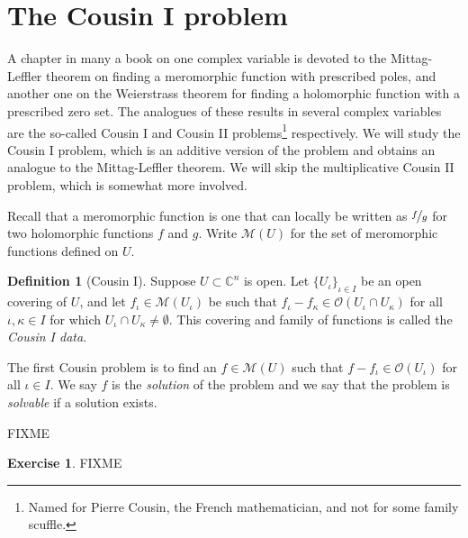 \documentclass[12pt,openany]{book}
\newcommand{\C}{{\mathbb{C}}}
\newcommand{\sM}{{\mathscr{M}}}
\newcommand{\sO}{{\mathscr{O}}}
\newcommand{\myindex}[1]{#1\index{#1}}
\theoremstyle{plain}
\theoremstyle{remark}
\theoremstyle{definition}
\newtheorem{defn}[thm]{Definition}
\newenvironment{exbox}{%
    \def\FrameCommand{\vrule width 1pt \relax\hspace{10pt}}%
    \MakeFramed{\advance\hsize-\width\FrameRestore}%
}{%
    \endMakeFramed
}
\theoremstyle{exercise}
\newtheorem{exercise}{Exercise}[section]
\theoremstyle{example}
\begin{document}

\section{The Cousin I problem} \label{sec:cousinI}

A chapter in many a book on one complex variable is devoted to the
Mittag-Leffler theorem on finding a meromorphic function with prescribed
poles, and another one on the Weierstrass theorem for finding a holomorphic
function with a prescribed zero set.  The analogues of these results in
several complex variables are the so-called Cousin I and Cousin II
problems\footnote{Named for Pierre Cousin, the French mathematician, and not
for some family scuffle.}
respectively.  We will study the Cousin I problem, which is an additive
version of the problem and obtains an analogue to the Mittag-Leffler
theorem.  We will skip the multiplicative Cousin II problem, which is
somewhat more involved.

Recall that a meromorphic function is one that can locally be
written as $\nicefrac{f}{g}$ for two holomorphic functions $f$ and $g$.
Write $\sM(U)$ for the set of meromorphic functions defined on $U$.

\begin{defn}[\myindex{Cousin I}]
Suppose $U \subset \C^n$ is open.
Let $\{ U_{\iota} \}_{\iota \in I}$ be an open covering of $U$,
and let $f_{\iota} \in \sM(U_{\iota})$ be such that $f_{\iota}-f_{\kappa}
\in \sO(U_{\iota} \cap U_{\kappa})$ for all $\iota,\kappa \in I$
for which $U_{\iota} \cap U_{\kappa} \not= \emptyset$.
This covering and family of functions is called the
\emph{\myindex{Cousin I data}}.

The first Cousin problem is to find an $f \in \sM(U)$
such that $f-f_{\iota} \in \sO(U_\iota)$ for all $\iota \in I$.
We say $f$ is the \emph{solution}
of the problem and we say that the problem is \emph{solvable} if a
solution exists.
\end{defn}

FIXME


\begin{exbox}
\begin{exercise}
FIXME
\end{exercise}
\end{exbox}

\end{document}
